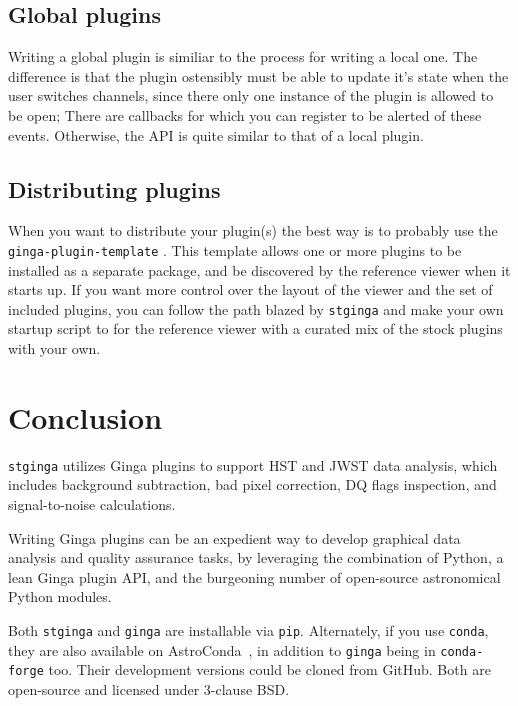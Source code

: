 \documentclass[11pt,twoside]{article}
\begin{document}
\subsection{Global plugins}

Writing a global plugin is similiar to the process for writing a local
one.  The difference is that the plugin ostensibly must be able to
update it's state when the user switches channels, since there only
one instance of the plugin is allowed to be open; There are callbacks
for which you can register to be alerted of these events. Otherwise,
the API is quite similar to that of a local plugin.

\subsection{Distributing plugins}

When you want to distribute your plugin(s) the best way is to probably use
the {\tt ginga-plugin-template} \citep{plugin-template}.
This template allows one
or more plugins to be installed as a separate package, and be
discovered by the reference viewer when it starts up.  If you want
more control over the layout of the viewer and the set of included
plugins, you can follow the path blazed by {\tt stginga} and make your own
startup script to for the reference viewer with a curated mix of the
stock plugins with your own.

\section{Conclusion}

{\tt stginga} utilizes Ginga plugins to support HST and JWST data analysis,
which includes background subtraction, bad pixel correction, DQ flags
inspection, and signal-to-noise calculations.

Writing Ginga plugins can be an expedient way to develop graphical data
analysis and quality assurance tasks, by leveraging the combination of
Python, a lean Ginga plugin API, and the burgeoning number of open-source
astronomical Python modules.

Both {\tt stginga} and {\tt ginga} are installable via {\tt pip}. Alternately,
if you use {\tt conda}, they are also available on AstroConda~\citep{astroconda},
in addition to {\tt ginga} being in  {\tt conda-forge} too. Their development
versions could be cloned from GitHub. Both are open-source and licensed under
3-clause BSD.


\end{document}
